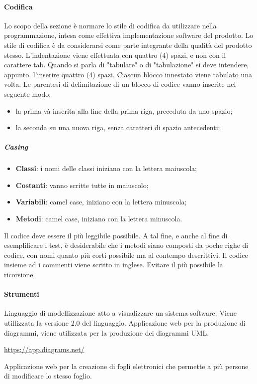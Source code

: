 		\paragraph{Codifica}
	    Lo scopo della sezione è normare lo stile di codifica da utilizzare nella programmazione, intesa come effettiva implementazione software del prodotto. Lo stile di codifica è da considerarsi come parte integrante della qualità del prodotto stesso.
	    L'indentazione viene effettuata con quattro (4) spazi, e non con il carattere tab. Quando si parla di "tabulare" o di "tabulazione" si deve intendere, appunto, l'inserire quattro (4) spazi.
	    Ciascun blocco innestato viene tabulato una volta.
	    Le parentesi di delimitazione di un blocco di codice vanno inserite nel seguente modo:
	    \begin{itemize}
	        \item la prima và inserita alla fine della prima riga, preceduta da uno spazio;
	        \item la seconda su una nuova riga, senza caratteri di spazio antecedenti;
	    \end{itemize}
	    
	    \subparagraph{Casing}
	    \begin{itemize}
	        \item \textbf{Classi}: i nomi delle classi iniziano con la lettera maiuscola;
	        \item \textbf{Costanti}: vanno scritte tutte in maiuscolo;
	        \item \textbf{Variabili}: camel case, iniziano con la lettera minuscola;
	        \item \textbf{Metodi}: camel case, iniziano con la lettera minuscola.
	    \end{itemize}
	    Il codice deve essere il più leggibile possibile. A tal fine, e anche al fine di esemplificare i test, è desiderabile che i metodi siano composti da poche righe di codice, con nomi quanto più corti possibile ma al contempo descrittivi.
	    Il codice insieme ad i commenti viene scritto in inglese.
	    Evitare il più possibile la ricorsione.
	    \paragraph{Strumenti}
	    Linguaggio di modellizzazione atto a visualizzare un sistema software. Viene utillizzata la versione 2.0 del linguaggio.
	    Applicazione web per la produzione di diagrammi, viene utilizzata per la produzione dei diagrammi UML.\\
	    \centerline{\url{https://app.diagrams.net/}}
	    Applicazione web per la creazione di fogli elettronici che permette a più persone di modificare lo stesso foglio.
